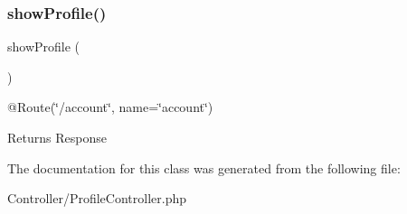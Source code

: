 \subsubsection{\texorpdfstring{showProfile()}{showProfile()}}
{\footnotesize\ttfamily show\+Profile (\begin{DoxyParamCaption}{ }\end{DoxyParamCaption})}

@\+Route(\char`\"{}/account\char`\"{}, name=\char`\"{}account\char`\"{}) \begin{DoxyReturn}{Returns}
Response 
\end{DoxyReturn}


The documentation for this class was generated from the following file\+:\begin{DoxyCompactItemize}
\item 
Controller/Profile\+Controller.\+php\end{DoxyCompactItemize}
